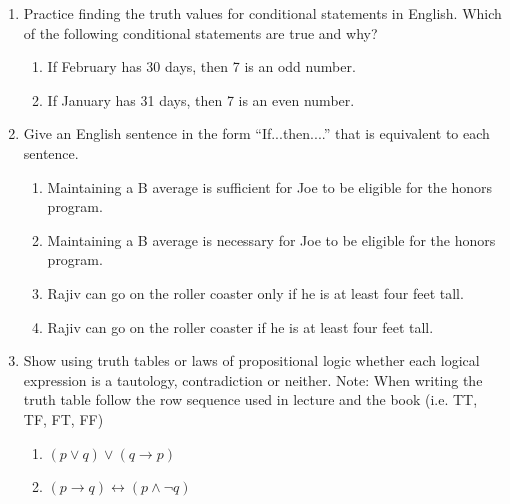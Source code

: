 \documentclass[12pt, oneside]{article}
\begin{document}
\begin{enumerate}
Write a logical expression for the requirements under the following conditions:\footnote{Inclusive or is assumed unless explicitly stated otherwise.}
\begin{enumerate}
    \item The applicant must present either a birth certificate, a driver's license, or a marriage license.
    \item The applicant must present at least two of the following forms of identification: birth certificate, driver's license, marriage license.
    \item Applicant must present either a birth certificate or both a driver's license and a marriage license
\end{enumerate}   

\item Practice finding the truth values for conditional statements in English. Which of the following conditional statements are true and why?
\begin{enumerate}
    \item If February has 30 days, then 7 is an odd number.
    \item If January has 31 days, then 7 is an even number.
\end{enumerate}
\newpage
\item Give an English sentence in the form ``If...then....'' that is equivalent to each sentence.
\begin{enumerate}
    \item Maintaining a B average is sufficient for Joe to be eligible for the honors program.
    \item Maintaining a B average is necessary for Joe to be eligible for the honors program.
    \item Rajiv can go on the roller coaster only if he is at least four feet tall.
    \item Rajiv can go on the roller coaster if he is at least four feet tall.
\end{enumerate}


\item  Show using truth tables or laws of propositional logic whether each logical expression is a tautology, contradiction or neither. Note: When writing the truth table follow the row sequence used in lecture and the book  (i.e. TT, TF, FT, FF)
\begin{enumerate}
    \item $(p \lor q) \lor (q \to p)$
    \item $(p \to q) \leftrightarrow (p \land \neg q)$
\end{enumerate}




\end{enumerate}
\end{document}
